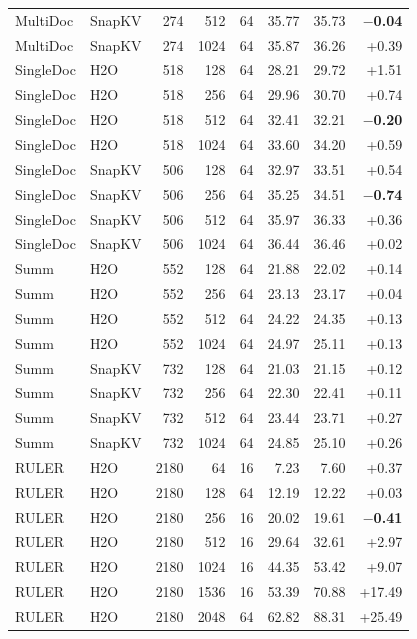 \begin{table}[t]
\begin{tabular}{@{}l l r r r r r r@{}}
    MultiDoc & SnapKV & 274 & 512 & 64 & 35.77 & 35.73 & \textbf{$-$0.04} \\
    MultiDoc & SnapKV & 274 & 1024 & 64 & 35.87 & 36.26 & +0.39 \\
    SingleDoc & H2O & 518 & 128 & 64 & 28.21 & 29.72 & +1.51 \\
    SingleDoc & H2O & 518 & 256 & 64 & 29.96 & 30.70 & +0.74 \\
    SingleDoc & H2O & 518 & 512 & 64 & 32.41 & 32.21 & \textbf{$-$0.20} \\
    SingleDoc & H2O & 518 & 1024 & 64 & 33.60 & 34.20 & +0.59 \\
    SingleDoc & SnapKV & 506 & 128 & 64 & 32.97 & 33.51 & +0.54 \\
    SingleDoc & SnapKV & 506 & 256 & 64 & 35.25 & 34.51 & \textbf{$-$0.74} \\
    SingleDoc & SnapKV & 506 & 512 & 64 & 35.97 & 36.33 & +0.36 \\
    SingleDoc & SnapKV & 506 & 1024 & 64 & 36.44 & 36.46 & +0.02 \\
    Summ & H2O & 552 & 128 & 64 & 21.88 & 22.02 & +0.14 \\
    Summ & H2O & 552 & 256 & 64 & 23.13 & 23.17 & +0.04 \\
    Summ & H2O & 552 & 512 & 64 & 24.22 & 24.35 & +0.13 \\
    Summ & H2O & 552 & 1024 & 64 & 24.97 & 25.11 & +0.13 \\
    Summ & SnapKV & 732 & 128 & 64 & 21.03 & 21.15 & +0.12 \\
    Summ & SnapKV & 732 & 256 & 64 & 22.30 & 22.41 & +0.11 \\
    Summ & SnapKV & 732 & 512 & 64 & 23.44 & 23.71 & +0.27 \\
    Summ & SnapKV & 732 & 1024 & 64 & 24.85 & 25.10 & +0.26 \\
    RULER & H2O & 2180 & 64 & 16 & 7.23 & 7.60 & +0.37 \\
    RULER & H2O & 2180 & 128 & 64 & 12.19 & 12.22 & +0.03 \\
    RULER & H2O & 2180 & 256 & 16 & 20.02 & 19.61 & \textbf{$-$0.41} \\
    RULER & H2O & 2180 & 512 & 16 & 29.64 & 32.61 & +2.97 \\
    RULER & H2O & 2180 & 1024 & 16 & 44.35 & 53.42 & +9.07 \\
    RULER & H2O & 2180 & 1536 & 16 & 53.39 & 70.88 & +17.49 \\
    RULER & H2O & 2180 & 2048 & 64 & 62.82 & 88.31 & +25.49 \\

\end{tabular}
\end{table}

